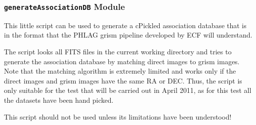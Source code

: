 \documentclass[letterpaper,10pt,english]{sphinxmanual}
\begin{document}
\subsubsection{\texttt{generateAssociationDB} Module}
\label{SamPy.grisms:module-SamPy.grisms.generateAssociationDB}\label{SamPy.grisms:generateassociationdb-module}
This little script can be used to generate a cPickled
association database that is in the format that the PHLAG
grism pipeline developed by ECF will understand.

The script looks all FITS files in the current working
directory and tries to generate the association database
by matching direct images to grism images. Note that the
matching algorithm is extremely limited and works only if
the direct images and grism images have the same RA or DEC.
Thus, the script is only suitable for the test that will
be carried out in April 2011, as for this test all the
datasets have been hand picked.

This script should not be used unless its limitations
have been understood!

\end{document}
